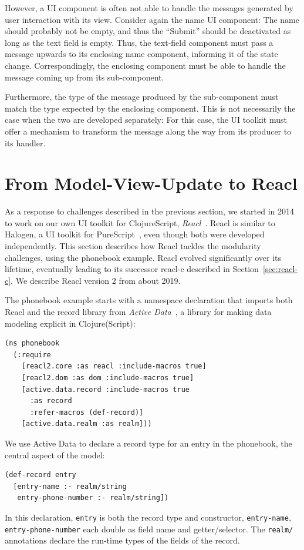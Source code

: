 \documentclass[sigplan,review,screen]{acmart}
\begin{document}
However, a UI component is often not able to handle the messages
generated by user interaction with its view.  Consider again the name UI
component: The name should probably not be empty, and thus the
``Submit'' should be deactivated as long as the text field is empty.
Thus, the text-field component must pass a message upwards to its
enclosing name component, informing it of the state change.
Correspondingly, the enclosing component must be able to handle the
message coming up from its sub-component.

Furthermore, the type of the message produced by the sub-component
must match the type expected by the enclosing component.  This is not
necessarily the case when the two are developed separately: For this
case, the UI toolkit must offer a mechanism to transform the message
along the way from its producer to its handler.

\section{From Model-View-Update to Reacl}
\label{sec:reacl}

As a response to challenges described in the previous section, we
started in 2014 to work on our own UI toolkit for ClojureScript,
\textit{Reacl}~\cite{Reacl}.  Reacl is similar to Halogen, a UI
toolkit for PureScript~\cite{Halogen}, even though both were developed
independently.
This section describes how Reacl tackles
the modularity challenges, using the phonebook example.  Reacl evolved
significantly over its lifetime, eventually leading to its successor
reacl-c described in Section~\ref{sec:reacl-c}.  We describe Reacl version 2
from about 2019.

The phonebook example starts with a namespace declaration that imports
both Reacl and the record library from \textit{Active
  Data}~\cite{ActiveData}, a library for making data modeling
explicit in Clojure(Script):
%
\begin{verbatim}
(ns phonebook
  (:require
    [reacl2.core :as reacl :include-macros true]
    [reacl2.dom :as dom :include-macros true]
    [active.data.record :include-macros true
      :as record
      :refer-macros (def-record)]
    [active.data.realm :as realm]))
\end{verbatim}
%
We use Active Data to declare a record type for an entry in the
phonebook, the central aspect of the model:
%
\begin{verbatim}
(def-record entry
  [entry-name :- realm/string
   entry-phone-number :- realm/string])
\end{verbatim}
%
In this declaration, \texttt{entry} is both the record type and
constructor, \texttt{entry-name},
\texttt{entry-phone-number} each double as field name and
getter/selector.  The \texttt{realm/} annotations declare the run-time
types of the fields of the record.
\end{document}
